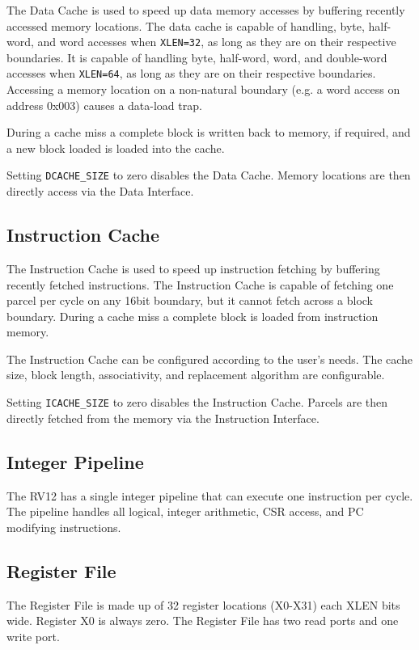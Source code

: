 The Data Cache is used to speed up data memory accesses by buffering
recently accessed memory locations. The data cache is capable of
handling, byte, half-word, and word accesses when \texttt{XLEN=32}, as long as
they are on their respective boundaries. It is capable of handling byte,
half-word, word, and double-word accesses when \texttt{XLEN=64}, as long as they
are on their respective boundaries. Accessing a memory location on a
non-natural boundary (e.g. a word access on address 0x003) causes a
data-load trap.

During a cache miss a complete block is written back to memory, if
required, and a new block loaded is loaded into the cache.

Setting \texttt{DCACHE\_SIZE} to zero disables the Data Cache. Memory locations
are then directly access via the Data Interface.

\subsection{Instruction Cache}\label{instruction-cache}

The Instruction Cache is used to speed up instruction fetching by
buffering recently fetched instructions. The Instruction Cache is
capable of fetching one parcel per cycle on any 16bit boundary, but it
cannot fetch across a block boundary. During a cache miss a complete
block is loaded from instruction memory.

The Instruction Cache can be configured according to the user's needs.
The cache size, block length, associativity, and replacement algorithm
are configurable.

Setting \texttt{ICACHE\_SIZE} to zero disables the Instruction Cache. Parcels are
then directly fetched from the memory via the Instruction Interface.

\subsection{Integer Pipeline}\label{integer-pipeline}

The RV12 has a single integer pipeline that can execute one instruction per cycle.
The pipeline handles all logical, integer arithmetic, CSR access, and PC
modifying instructions.


\subsection{Register File}\label{register-file}

The Register File is made up of 32 register locations (X0-X31) each XLEN
bits wide. Register X0 is always zero. The Register File has two read
ports and one write port.
